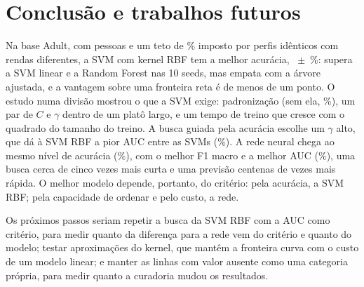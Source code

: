 \section{Conclusão e trabalhos futuros}

Na base Adult, com \svLinhas{} pessoas e um teto de \svTeto\% imposto por perfis idênticos com rendas diferentes, a SVM com kernel RBF tem a melhor acurácia, \svRBFAcc~$\pm$~\svRBFSd\%: supera a SVM linear e a Random Forest nas 10 seeds, mas empata com a árvore ajustada, e a vantagem sobre uma fronteira reta é de menos de um ponto. O estudo numa divisão mostrou o que a SVM exige: padronização (sem ela, \svPadSem\%), um par de $C$ e $\gamma$ dentro de um platô largo, e um tempo de treino que cresce com o quadrado do tamanho do treino. A busca guiada pela acurácia escolhe um $\gamma$ alto, que dá à SVM RBF a pior AUC entre as SVMs (\svRBFAuc\%). A rede neural chega ao mesmo nível de acurácia (\svRedeAcc\%), com o melhor F1 macro e a melhor AUC (\svRedeAuc\%), uma busca cerca de cinco vezes mais curta e uma previsão centenas de vezes mais rápida. O melhor modelo depende, portanto, do critério: pela acurácia, a SVM RBF; pela capacidade de ordenar e pelo custo, a rede.

Os próximos passos seriam repetir a busca da SVM RBF com a AUC como critério, para medir quanto da diferença para a rede vem do critério e quanto do modelo; testar aproximações do kernel, que mantêm a fronteira curva com o custo de um modelo linear; e manter as linhas com valor ausente como uma categoria própria, para medir quanto a curadoria mudou os resultados.
